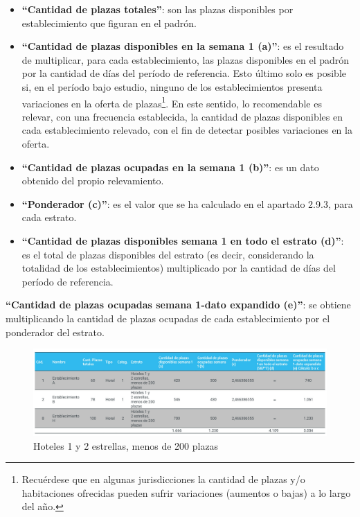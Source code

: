 \documentclass[
]{book}
\begin{document}
\begin{itemize}
\item
  \textbf{``Cantidad de plazas totales''}: son las plazas disponibles por establecimiento que figuran en el padrón.
\item
  \textbf{``Cantidad de plazas disponibles en la semana 1 (a)''}: es el resultado de multiplicar, para cada establecimiento, las plazas disponibles en el padrón por la cantidad de días del período de referencia. Esto último solo es posible si, en el período bajo estudio, ninguno de los establecimientos presenta variaciones en la oferta de plazas\footnote{Recuérdese que en algunas jurisdicciones la cantidad de plazas y/o habitaciones ofrecidas pueden sufrir variaciones (aumentos o bajas) a lo largo del año.}. En este sentido, lo recomendable es relevar, con una frecuencia establecida, la cantidad de plazas disponibles en cada establecimiento relevado, con el fin de detectar posibles variaciones en la oferta.
\item
  \textbf{``Cantidad de plazas ocupadas en la semana 1 (b)''}: es un dato obtenido del propio relevamiento.
\item
  \textbf{``Ponderador (c)''}: es el valor que se ha calculado en el apartado 2.9.3, para cada estrato.
\item
  \textbf{``Cantidad de plazas disponibles semana 1 en todo el estrato (d)''}: es el total de plazas disponibles del estrato (es decir, considerando la totalidad de los establecimientos) multiplicado por la cantidad de días del período de referencia.
\end{itemize}

\textbf{``Cantidad de plazas ocupadas semana 1-dato expandido (e)''}: se obtiene multiplicando la cantidad de plazas ocupadas de cada establecimiento por el ponderador del estrato.

\begin{figure}

{\centering \includegraphics[width=1\linewidth]{imagenes/hoteles1y2_estrellas_menos_de_200_plazas} 

}

\caption{Hoteles 1 y 2 estrellas, menos de 200 plazas}\label{fig:1-2-estrellas}
\end{figure}
\end{document}
